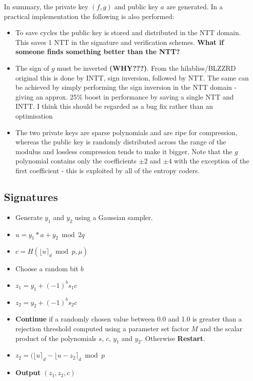 In summary, the private key $(f, g)$ and public key $a$ are generated. In a practical implementation the following is also performed:

\begin{itemize}
\item To save cycles the public key is stored and distributed in the NTT domain. This saves 1 NTT in the signature and verification schemes. \textbf{What if someone finds something better than the NTT?}
\item The sign of $g$ must be inverted \textbf{(WHY???)}. From the hilabliss/BLZZRD original this is done by INTT, sign inversion, followed by NTT. The same can be achieved by simply performing the sign inversion in the NTT domain - giving an approx. 25\% boost in performance by saving a single NTT and INTT. I think this should be regarded as a bug fix rather than an optimisation
\item The two private keys are sparse polynomials and are ripe for compression, whereas the public key is randomly distributed across the range of the modulus and lossless compression tends to make it bigger. Note that the $g$ polynomial contains only the coefficients $\pm 2$ and $\pm 4$ with the exception of the first coefficient - this is exploited by all of the entropy coders. 
\end{itemize}

\subsection{Signatures}

\begin{itemize}
\item Generate $y_1$ and $y_2$ using a Gaussian sampler.
\item $u = y_1 * a + y_2 \bmod 2q$
\item $c = H(\lfloor u \rceil_d \bmod p, \mu)$
\item Choose a random bit $b$
\item $z_1 = y_1 + (-1)^b s_1 c$
\item $z_2 = y_2 + (-1)^b s_2 c$
\item \textbf{Continue} if a randomly chosen value between 0.0 and 1.0 is greater than a rejection threshold computed using a parameter set factor $M$  and the scalar product of the polynomials $s$, $c$, $y_1$ and $y_2$. Otherwise \textbf{Restart}.
\item $z_2 = ( \lfloor u \rceil_d - \lfloor u - z_2 \rceil_d \bmod p$
\item \textbf{Output} $(z_1, z_2, c)$
\end{itemize}

